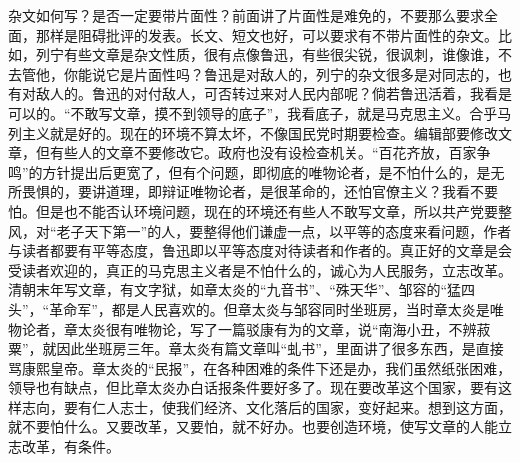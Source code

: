 杂文如何写？是否一定要带片面性？前面讲了片面性是难免的，不要那么要求全面，那样是阻碍批评的发表。长文、短文也好，可以要求有不带片面性的杂文。比如，列宁有些文章是杂文性质，很有点像鲁迅，有些很尖锐，很讽刺，谁像谁，不去管他，你能说它是片面性吗？鲁迅是对敌人的，列宁的杂文很多是对同志的，也有对敌人的。鲁迅的对付敌人，可否转过来对人民内部呢？倘若鲁迅活着，我看是可以的。“不敢写文章，摸不到领导的底子”，我看底子，就是马克思主义。合乎马列主义就是好的。现在的环境不算太坏，不像国民党时期要检查。编辑部要修改文章，但有些人的文章不要修改它。政府也没有设检查机关。“百花齐放，百家争鸣”的方针提出后更宽了，但有个问题，即彻底的唯物论者，是不怕什么的，是无所畏惧的，要讲道理，即辩证唯物论者，是很革命的，还怕官僚主义？我看不要怕。但是也不能否认环境问题，现在的环境还有些人不敢写文章，所以共产党要整风，对“老子天下第一”的人，要整得他们谦虚一点，以平等的态度来看问题，作者与读者都要有平等态度，鲁迅即以平等态度对待读者和作者的。真正好的文章是会受读者欢迎的，真正的马克思主义者是不怕什么的，诚心为人民服务，立志改革。清朝末年写文章，有文字狱，如章太炎的“九音书”、“殊天华”、邹容的“猛四头”，“革命军”，都是人民喜欢的。但章太炎与邹容同时坐班房，当时章太炎是唯物论者，章太炎很有唯物论，写了一篇驳康有为的文章，说“南海小丑，不辨菽粟”，就因此坐班房三年。章太炎有篇文章叫“虬书”，里面讲了很多东西，是直接骂康熙皇帝。章太炎的“民报”，在各种困难的条件下还是办，我们虽然纸张困难，领导也有缺点，但比章太炎办白话报条件要好多了。现在要改革这个国家，要有这样志向，要有仁人志士，使我们经济、文化落后的国家，变好起来。想到这方面，就不要怕什么。又要改革，又要怕，就不好办。也要创造环境，使写文章的人能立志改革，有条件。


